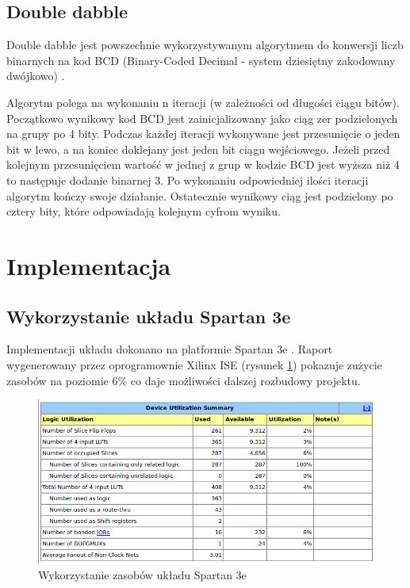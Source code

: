 \documentclass[a4paper]{article}
\begin{document}
\subsection{Double dabble}
Double dabble jest powszechnie wykorzystywanym algorytmem do konwersji liczb binarnych na kod BCD (Binary-Coded Decimal - system dziesiętny zakodowany dwójkowo) \cite{bib_dabble}. 

Algorytm polega na wykonaniu n iteracji (w zależności od długości ciągu bitów). Początkowo wynikowy kod BCD jest zainicjalizowany jako ciąg zer podzielonych na grupy po 4 bity. Podczas każdej iteracji wykonywane jest przesunięcie o jeden bit w lewo, a na koniec doklejany jest jeden bit ciągu wejściowego. Jeżeli przed kolejnym przesunięciem wartość w jednej z grup w kodzie BCD jest wyższa niż 4 to następuje dodanie binarnej 3. Po wykonaniu odpowiedniej ilości iteracji algorytm kończy swoje działanie. Ostatecznie wynikowy ciąg jest podzielony po cztery bity, które odpowiadają kolejnym cyfrom wyniku. 

\section{Implementacja}

\subsection{Wykorzystanie układu Spartan 3e}

Implementacji układu dokonano na platformie Spartan 3e \cite{bib_spartan}. Raport wygenerowany przez oprogramownie Xilinx ISE (rysunek \ref{raport}) pokazuje zużycie zasobów na poziomie 6\% co daje możliwości dalszej rozbudowy projektu.

\begin{figure}[H]
\begin{center}
\includegraphics[width=14cm]{graphics/summary.png}
\end{center}
\caption{Wykorzystanie zasobów układu Spartan 3e}
\label{raport}
\end{figure}
\end{document}
